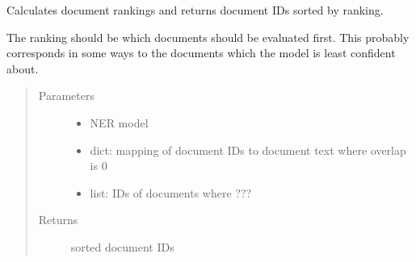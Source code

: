 \documentclass[letterpaper,10pt,english]{sphinxmanual}
\begin{document}
\begin{fulllineitems}

\begin{fulllineitems}
\label{\detokenize{autoapi/pine/pipelines/NER_API/index:pine.pipelines.NER_API.ner_api.get_document_ranking}}
\sphinxAtStartPar
Calculates document rankings and returns document IDs sorted by ranking.

\sphinxAtStartPar
The ranking should be which documents should be evaluated first.  This probably
corresponds in some ways to the documents which the model is least confident about.
\begin{quote}\begin{description}
\item[{Parameters}] \leavevmode\begin{itemize}
\item {} 
\sphinxAtStartPar
{} \textendash{} NER model

\item {} 
\sphinxAtStartPar
{} \textendash{} dict: mapping of document IDs to document text where overlap is 0

\item {} 
\sphinxAtStartPar
{} \textendash{} list: IDs of documents where ???

\end{itemize}

\item[{Returns}] \leavevmode
\sphinxAtStartPar
sorted document IDs


\end{description}
\end{quote}
\end{fulllineitems}
\end{fulllineitems}
\end{document}
